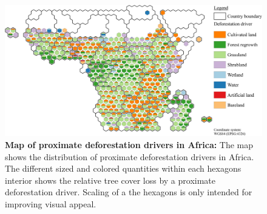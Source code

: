 			\begin{figure}[ht]
				\centering
				\includegraphics[scale=1]{img/africa_driver_frameless}
				\caption[Map of proximate deforestion drivers in Africa]{\textbf{Map of proximate deforestation drivers in Africa:} The map shows the distribution of proximate deforestation drivers in Africa. The different sized and colored quantities within each hexagons interior shows the relative tree cover loss by a proximate deforestation driver. Scaling of a the hexagons is only intended for improving visual appeal.}
				\label{fig:africa_driver}
			\end{figure}


